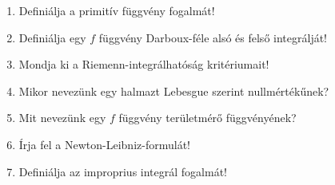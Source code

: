 \vfill
\begin{questions}[section.7.5]
  \begin{enumerate}
    \item Definiálja a primitív függvény fogalmát!
    \item Definiálja egy $f$ függvény Darboux-féle alsó és felső integrálját!
    \item Mondja ki a Riemenn-integrálhatóság kritériumait!
    \item Mikor nevezünk egy halmazt Lebesgue szerint nullmértékűnek?
    \item Mit nevezünk egy $f$ függvény területmérő függvényének?
    \item Írja fel a Newton-Leibniz-formulát!
    \item Definiálja az improprius integrál fogalmát!
  \end{enumerate}
\end{questions}